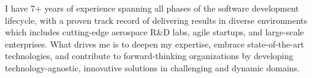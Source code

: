 
\begin{cvparagraph}
\large I have 7+ years of experience spanning all phases of the software development lifecycle, with a proven track record of delivering results in diverse environments which includes cutting-edge aerospace R\&D labs, agile startups, and large-scale enterprises. What drives me is to deepen my expertise, embrace state-of-the-art technologies, and contribute to forward-thinking organizations by developing technology-agnostic, innovative solutions in challenging and dynamic domains.
\end{cvparagraph}

